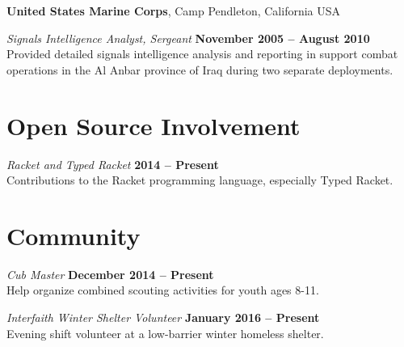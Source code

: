 \documentclass[margin,line]{res}
\begin{document}
\begin{resume}
{\bf United States Marine Corps}, Camp Pendleton, California USA

\vspace{-.3cm}
{\em Signals Intelligence Analyst, Sergeant} \hfill {\bf November 2005 -- August 2010}\\
Provided detailed signals intelligence analysis and reporting in
support combat operations in the Al Anbar province of Iraq during two
separate deployments.

\section{\sc Open Source Involvement}

{\em Racket and Typed Racket} \hfill {\bf 2014 --
  Present}\\ Contributions to the Racket programming language,
especially Typed Racket.

\section{\sc Community}

{\em Cub Master} \hfill {\bf December 2014 -- Present}\\
Help organize combined scouting activities for youth ages 8-11.

\vspace{-.3cm} {\em Interfaith Winter Shelter Volunteer} \hfill {\bf
  January 2016 -- Present }\\ Evening shift volunteer at a low-barrier
winter homeless shelter.


\end{resume}
\end{document}
